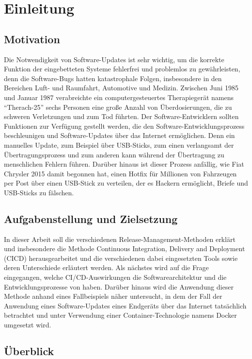 \chapter{Einleitung}

\section{Motivation}

Die Notwendigkeit von Software-Updates ist sehr wichtig, um die korrekte Funktion
der eingebetteten Systeme fehlerfrei und problemlos zu gewährleisten, denn die Software-Bugs hatten katastrophale Folgen, insbesondere in den Bereichen Luft- und Raumfahrt, Automotive und Medizin. Zwischen Juni 1985 und Januar 1987 verabreichte ein computergesteuertes Therapiegerät namens “Therach-25” sechs Personen eine große Anzahl von Überdosierungen, die zu schweren Verletzungen und zum Tod führten.
Der Software-Entwicklern sollten Funktionen zur Verfügung gestellt werden, die den Software-Entwicklungsprozess beschleunigen und Software-Updates über das Internet ermöglichen. Denn ein manuelles Update, zum Beispiel über USB-Sticks, zum einen verlangsamt der Übertragungsprozess und zum anderen kann während der Übertragung zu menschlichen Fehlern führen. Darüber hinaus ist dieser Prozess anfällig, wie Fiat Chrysler 2015 damit begonnen hat, einen Hotfix für Millionen von Fahrzeugen per Post über einen USB-Stick zu verteilen, der es Hackern ermöglicht, Briefe und USB-Sticks zu fälschen.


\section{Aufgabenstellung und Zielsetzung}

In dieser Arbeit soll die verschiedenen Release-Management-Methoden erklärt und insbesondere die Methode Continuous Integration, Delivery and Deployment (CICD) herausgearbeitet und die verschiedenen dabei eingesetzten Tools sowie deren Unterschiede erläutert werden. Als nächstes wird auf die Frage eingegangen, welche CI/CD-Auswirkungen die Softwarearchitektur und die Entwicklungsprozesse von haben. Darüber hinaus wird die Anwendung dieser Methode anhand eines Fallbeispiels näher untersucht, in dem der Fall der Anwendung eines Software-Updates eines Endgeräts über das Internet tatsächlich betrachtet und unter Verwendung einer Container-Technologie namens Docker umgesetzt wird.

\section{Überblick}

